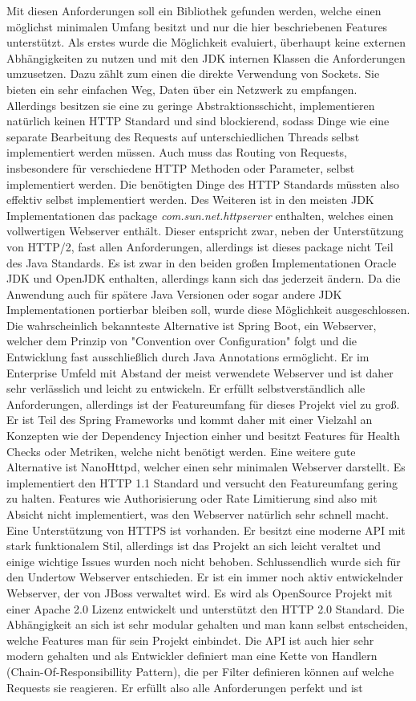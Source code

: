 Mit diesen Anforderungen soll ein Bibliothek gefunden werden, welche einen möglichst minimalen Umfang besitzt und nur die hier beschriebenen Features unterstützt. Als erstes wurde die Möglichkeit evaluiert, überhaupt keine externen Abhängigkeiten zu nutzen und mit den JDK internen Klassen die Anforderungen umzusetzen. Dazu zählt zum einen die direkte Verwendung von Sockets. Sie bieten ein sehr einfachen Weg, Daten über ein Netzwerk zu empfangen. Allerdings besitzen sie eine zu geringe Abstraktionsschicht, implementieren natürlich keinen HTTP Standard und sind blockierend, sodass Dinge wie eine separate Bearbeitung des Requests auf unterschiedlichen Threads selbst implementiert werden müssen. Auch muss das Routing von Requests, insbesondere für verschiedene HTTP Methoden oder Parameter, selbst implementiert werden. Die benötigten Dinge des HTTP Standards müssten also effektiv selbst implementiert werden. Des Weiteren ist in den meisten JDK Implementationen das package \textit{com.sun.net.httpserver} enthalten, welches einen vollwertigen Webserver enthält. Dieser entspricht zwar, neben der Unterstützung von HTTP/2, fast allen Anforderungen, allerdings ist dieses package nicht Teil des Java Standards. Es ist zwar in den beiden großen Implementationen Oracle JDK und OpenJDK enthalten, allerdings kann sich das jederzeit ändern. Da die Anwendung auch für spätere Java Versionen oder sogar andere JDK Implementationen portierbar bleiben soll, wurde diese Möglichkeit ausgeschlossen. Die wahrscheinlich bekannteste Alternative ist Spring Boot, ein Webserver, welcher dem Prinzip von "Convention over Configuration" folgt und die Entwicklung fast ausschließlich durch Java Annotations ermöglicht. Er im Enterprise Umfeld mit Abstand der meist verwendete Webserver und ist daher sehr verlässlich und leicht zu entwickeln. Er erfüllt selbstverständlich alle Anforderungen, allerdings ist der Featureumfang für dieses Projekt viel zu groß. Er ist Teil des Spring Frameworks und kommt daher mit einer Vielzahl an Konzepten wie  der Dependency Injection einher und besitzt Features für Health Checks oder Metriken, welche nicht benötigt werden. Eine weitere gute Alternative ist NanoHttpd, welcher einen sehr minimalen Webserver darstellt. Es implementiert den HTTP 1.1 Standard und versucht den Featureumfang gering zu halten. Features wie Authorisierung oder Rate Limitierung sind also mit Absicht nicht implementiert, was den Webserver natürlich sehr schnell macht. Eine Unterstützung von HTTPS ist vorhanden. Er besitzt eine moderne API mit stark funktionalem Stil, allerdings ist das Projekt an sich leicht veraltet und einige wichtige Issues wurden noch nicht behoben. Schlussendlich wurde sich für den Undertow Webserver entschieden. Er ist ein immer noch aktiv entwickelnder Webserver, der von JBoss verwaltet wird. Es wird als OpenSource Projekt mit einer Apache 2.0 Lizenz entwickelt und unterstützt den HTTP 2.0 Standard. Die Abhängigkeit an sich ist sehr modular gehalten und man kann selbst entscheiden, welche Features man für sein Projekt einbindet. Die API ist auch hier sehr modern gehalten und als Entwickler definiert man eine Kette von Handlern (Chain-Of-Responsibillity Pattern), die per Filter definieren können auf welche Requests sie reagieren. Er erfüllt also alle Anforderungen perfekt und ist 